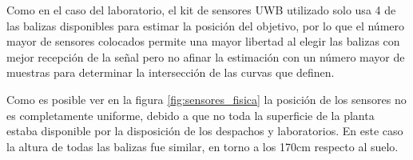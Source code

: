 Como en el caso del laboratorio, el kit de sensores UWB utilizado solo usa 4 de las balizas disponibles para estimar la posición del objetivo, por lo que el número mayor de sensores colocados permite una mayor libertad al elegir las balizas con mejor recepción de la señal pero no afinar la estimación con un número mayor de muestras para determinar la intersección de las curvas que definen.

Como es posible ver en la figura \ref{fig:sensores_fisica} la posición de los sensores no es completamente uniforme, debido a que no toda la superficie de la planta estaba disponible por la disposición de los despachos y laboratorios.
En este caso la altura de todas las balizas fue similar, en torno a los 170cm respecto al suelo.